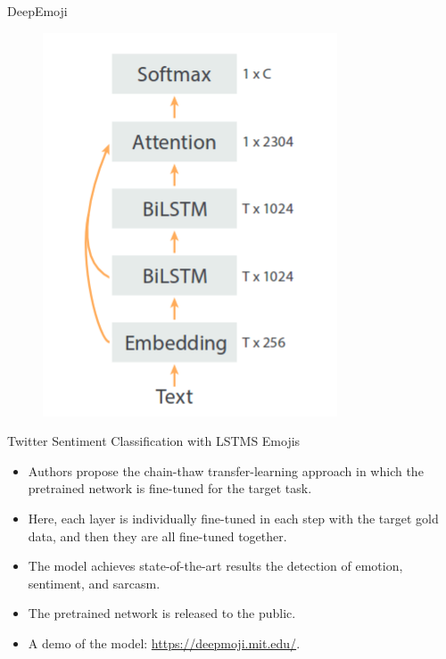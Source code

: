 \documentclass[handout]{beamer}
\begin{document}
\begin{frame}{DeepEmoji}
   
    \begin{figure}[h]
        	\includegraphics[scale = 0.45]{pics/deepEmoji2.png}
        \end{figure}       
        
\end{frame}




\begin{frame}{Twitter Sentiment Classification with LSTMS Emojis}
\begin{scriptsize}
\begin{itemize}
\item Authors propose the chain-thaw transfer-learning approach in which the pretrained network is fine-tuned for the target task. 
\item Here, each layer is individually fine-tuned in each step with the target gold data, and then they are all fine-tuned together. 
\item The model achieves state-of-the-art results the detection of emotion, sentiment, and sarcasm. 
\item  The pretrained network is released to the public.

\item  A demo of the model: \url{https://deepmoji.mit.edu/}.
\end{itemize}
\end{scriptsize}
\end{frame}
\end{document}

